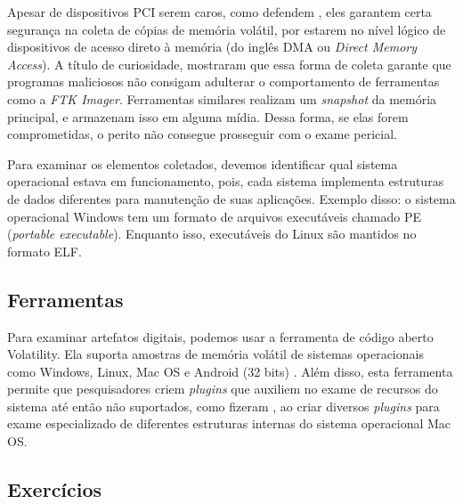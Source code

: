     \vspace{4mm}
    
    \hspace{1cm}
    Apesar de dispositivos PCI serem caros, como defendem , eles garantem certa segurança na coleta de cópias de memória volátil, por estarem no nível lógico de dispositivos de acesso direto à memória (do inglês DMA ou \textit{Direct Memory Access}). A título de curiosidade,  mostraram que essa forma de coleta garante que programas maliciosos não consigam adulterar o comportamento de ferramentas como a \textit{FTK Imager}. Ferramentas similares realizam um \textit{snapshot} da memória principal, e armazenam isso em alguma mídia. Dessa forma, se elas forem comprometidas, o perito não consegue prosseguir com o exame pericial.
    
    \vspace{4mm}
    
    \hspace{1cm}
    Para examinar os elementos coletados, devemos identificar qual sistema operacional estava em funcionamento, pois, cada sistema implementa estruturas de dados diferentes para manutenção de suas aplicações. Exemplo disso: o sistema operacional Windows tem um formato de arquivos executáveis chamado PE (\textit{portable executable}). Enquanto isso, executáveis do Linux são mantidos no formato ELF.
   
    \subsection{Ferramentas}

    \hspace{1cm}
    Para examinar artefatos digitais, podemos usar a ferramenta de código aberto Volatility. Ela suporta amostras de memória volátil de sistemas operacionais como Windows, Linux, Mac OS e Android (32 bits) \cite{ligh2014}. Além disso, esta ferramenta permite que pesquisadores criem \textit{plugins} que auxiliem no exame de recursos do sistema até então não suportados, como fizeram , ao criar diversos \textit{plugins} para exame especializado de diferentes estruturas internas do sistema operacional Mac OS.

    \subsection{Exercícios}
    
